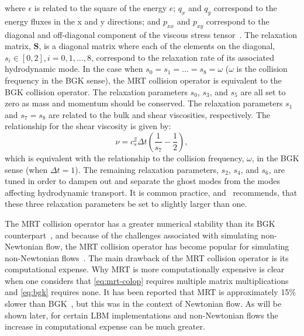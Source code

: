 \documentclass[pdftex,ms]{pittetd}
\newcommand{\relaxM}{\mathbf{S}}
\begin{document}
\noindent where $\epsilon$ is related to the square of the energy $e$; $q_x$ and $q_y$ correspond to the energy fluxes in the x and y directions; and $p_{xx}$ and $p_{xy}$ correspond to the diagonal and off-diagonal component of the viscous stress tensor~\cite{lallemand2000theory}. %
The relaxation matrix, $\relaxM$, is a diagonal matrix where each of the elements on the diagonal, $s_i \in [0, 2], i = 0, 1, ..., 8$, correspond to the relaxation rate of its associated hydrodynamic mode.
In the case when $s_0 = s_1 = ... = s_8 = \omega$ ($\omega$ is the collision frequency in the BGK sense), the MRT collision operator is equivalent to the BGK collision operator.
The relaxation parameters $s_0$, $s_3$, and $s_5$ are all set to zero as mass and momentum should be conserved.
The relaxation parameters $s_1$ and $s_7 = s_8$ are related to the bulk and shear viscosities, respectively.
The relationship for the shear viscosity is given by:
\begin{equation} \label{eq:mrt-s7}
\nu = c_s^2 \Delta t (\frac{1}{s_7} - \frac{1}{2}),
\end{equation}
\noindent which is equivalent with the relationship to the collision frequency, $\omega$, in the BGK sense (when $\Delta t = 1$).
The remaining relaxation parameters, $s_2$, $s_4$, and $s_6$, are tuned in order to dampen out and separate the ghost modes from the modes affecting hydrodynamic transport.
It is common practice, and~\citet{lallemand2000theory} recommends, that these three relaxation parameters be set to slightly larger than one.

The MRT collision operator has a greater numerical stability than its BGK counterpart~\cite{lallemand2000theory,dellar2003incompressible,d2002multiple}, and because of the challenges associated with simulating non-Newtonian flow, the MRT collision operator has become popular for simulating non-Newtonian flows~\cite{chen2014simulations,fallah2012multiple,tang2011bingham,vikhansky2008lattice,chai2011multiple,grasinger2015simulation}.
The main drawback of the MRT collision operator is its computational expense.
Why MRT is more computationally expensive is clear when one considers that \eqref{eq:mrt-colop} requires multiple matrix multiplications and \eqref{eq:bgk} requires none.
It has been reported that MRT is approximately 15\% slower than BGK~\cite{d2002multiple}, but this was in the context of Newtonian flow.
As will be shown later, for certain LBM implementations and non-Newtonian flows the increase in computational expense can be much greater.
\end{document}
